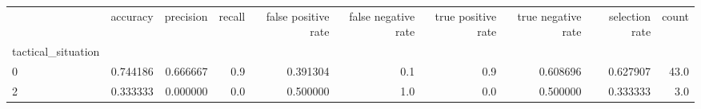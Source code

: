 \begin{tabular}{lrrrrrrrrr}
\toprule
{} &  accuracy &  precision &  recall &  false positive rate &  false negative rate &  true positive rate &  true negative rate &  selection rate &  count \\
tactical\_situation &           &            &         &                      &                      &                     &                     &                 &        \\
\midrule
0                  &  0.744186 &   0.666667 &     0.9 &             0.391304 &                  0.1 &                 0.9 &            0.608696 &        0.627907 &   43.0 \\
2                  &  0.333333 &   0.000000 &     0.0 &             0.500000 &                  1.0 &                 0.0 &            0.500000 &        0.333333 &    3.0 \\
\bottomrule
\end{tabular}
